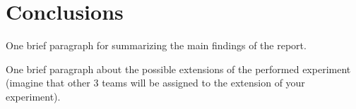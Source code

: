 \section{Conclusions}\label{sec:conclusions}

One brief paragraph for summarizing the main findings of the report.

One brief paragraph about the possible extensions of the performed experiment (imagine that other 3 teams will be assigned to the extension of your experiment).   